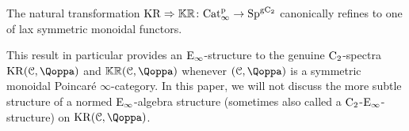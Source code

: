 \begin{corollary}
\label{corollary:real-is-lax-symmetric-monoidal}%
The natural transformation $\operatorname{KR} \Rightarrow \mathbb{KR} \colon \mathrm{Cat}^{\mathrm p}_\infty \rightarrow \mathrm{Sp}^{\mathrm{g}\mathrm{C_2}}$ canonically refines to one of lax symmetric monoidal functors.
\end{corollary}


This result in particular provides an ${\mathrm{E}_{\infty}}$-structure to the genuine $\mathrm{C_2}$-spectra $\KR(\C,\QF)$ and $\KKR(\C,\QF)$ whenever $(\C,\QF)$ is a symmetric monoidal Poincar\'e $\infty$-category. In this paper, we will not discuss the more subtle structure of a normed ${\mathrm{E}_{\infty}}$-algebra structure (sometimes also called a $\mathrm{C_2}$-${\mathrm{E}_{\infty}}$-structure) on $\KR(\C,\QF)$. 









